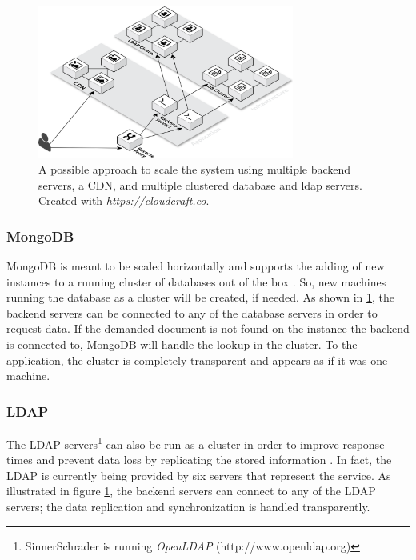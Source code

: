 \begin{figure}[!htp]
    \centering
    \includegraphics[width=0.75\textwidth]{images/system_architecture_scaled.png}
    \caption[Illustration: Scaled System Architecture]{A possible approach to scale the system using multiple backend servers, a CDN, and multiple clustered database and ldap servers. Created with \textit{https://cloudcraft.co}.}
    \label{scaleup}
\end{figure}

\newpage
\subsubsection{MongoDB}
MongoDB is meant to be scaled horizontally and supports the adding of new instances to a running cluster of databases out of the box \cite[p. 19]{MongoGuide}. So, new machines running the database as a cluster will be created, if needed. As shown in \ref{scaleup}, the backend servers can be connected to any of the database servers in order to request data. If the demanded document is not found on the instance the backend is connected to, MongoDB will handle the lookup in the cluster. To the application, the cluster is completely transparent and appears as if it was one machine.

\subsubsection{LDAP}
The LDAP servers\footnote{SinnerSchrader is running \textit{OpenLDAP} (http://www.openldap.org)} can also be run as a cluster in order to improve response times and prevent data loss by replicating the stored information \cite{ldapscale}. In fact, the LDAP is currently being provided by six servers that represent the service. As illustrated in figure \ref{scaleup}, the backend servers can connect to any of the LDAP servers; the data replication and synchronization is handled transparently.


